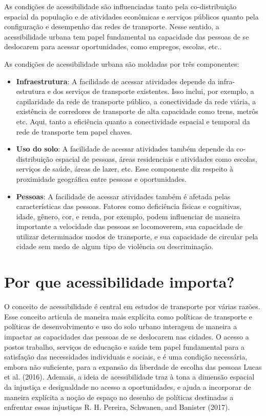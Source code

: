 \documentclass[
  letterpaper,
  DIV=11,
  numbers=noendperiod]{scrreprt}
\begin{document}
As condições de acessibilidade são influenciadas tanto pela
co-distribuição espacial da população e de atividades econômicas e
serviços públicos quanto pela configuração e desempenho das redes de
transporte. Nesse sentido, a acessibilidade urbana tem papel fundamental
na capacidade das pessoas de se deslocarem para acessar oportunidades,
como empregos, escolas, etc..

As condições de acessibilidade urbana são moldadas por três componentes:

\begin{itemize}
\item
  \textbf{Infraestrutura}: A facilidade de acessar atividades depende da
  infra-estrutura e dos serviços de transporte existentes. Isso inclui,
  por exemplo, a capilaridade da rede de transporte público, a
  conectividade da rede viária, a existência de corredores de transporte
  de alta capacidade como trens, metrôs etc. Aqui, tanto a eficiência
  quanto a conectividade espacial e temporal da rede de transporte tem
  papel chaves.
\item
  \textbf{Uso do solo}: A facilidade de acessar atividades também
  depende da co-distribuição espacial de pessoas, áreas residenciais e
  atividades como escolas, serviços de saúde, áreas de lazer, etc. Esse
  componente diz respeito à proximidade geográfica entre pessoas e
  oportunidades.
\item
  \textbf{Pessoas}: A facilidade de acessar atividades também é afetada
  pelas características das pessoas. Fatores como deficiência físicas e
  cognitivas, idade, gênero, cor, e renda, por exemplo, podem
  influenciar de maneira importante a velocidade das pessoas se
  locomoverem, sua capacidade de utilizar determinados modos de
  transporte, e sua capacidade de circular pela cidade sem medo de algum
  tipo de violência ou descriminação.
\end{itemize}

\hypertarget{por-que-acessibilidade-importa}{%
\section{Por que acessibilidade
importa?}\label{por-que-acessibilidade-importa}}

O conceito de acessibilidade é central em estudos de transporte por
várias razões. Esse conceito articula de maneira mais explícita como
políticas de transporte e políticas de desenvolvimento e uso do solo
urbano interagem de maneira a impactar as capacidades das pessoas de se
deslocarem nas cidades. O acesso a postos trabalho, serviços de educação
e saúde tem papel fundamental para a satisfação das necessidades
individuais e sociais, e é uma condição necessária, embora não
suficiente, para a expansão da liberdade de escolha das pessoas Lucas et
al. (2016). Ademais, a ideia de acessibilidade traz à tona a dimensão
espacial da injustiça e desigualdade no acesso a oportunidades, e ajuda
a incorporar de maneira explícita a noção de espaço no desenho de
políticas destinadas a enfrentar essas injustiças R. H. Pereira,
Schwanen, and Banister (2017).
\end{document}
